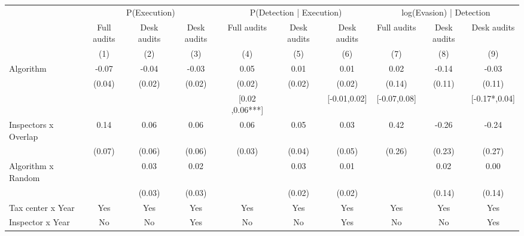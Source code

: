 \begin{tabular}{lccc|ccc|ccc} \toprule
\multicolumn{1}{l}{} & \multicolumn{3}{c}{P(Execution)} & \multicolumn{3}{c}{P(Detection | Execution)} & \multicolumn{3}{c}{log(Evasion) | Detection} \\\cmidrule(lr){2-4}\cmidrule(lr){5-7}\cmidrule(lr){8-10} \multicolumn{1}{l}{} & Full audits & Desk audits & Desk audits & Full audits & Desk audits & Desk audits & Full audits & Desk audits & Desk audits \\ \multicolumn{1}{l}{} & (1) & (2) & (3) & (4) & (5) & (6) & (7) & (8) & (9) \\ \midrule
Algorithm   &       -0.07\sym{*}  &       -0.04         &       -0.03         &        0.05\sym{**} &        0.01         &        0.01         &        0.02         &       -0.14         &       -0.03         \\
            &      (0.04)         &      (0.02)         &      (0.02)         &      (0.02)         &      (0.02)         &      (0.02)         &      (0.14)         &      (0.11)         &      (0.11)         \\
\addlinespace
 & & & & [0.02 ,0.06***] & & [-0.01,0.02] & [-0.07,0.08] & & [-0.17*,0.04] \\  Inspectors x Overlap&        0.14\sym{**} &        0.06         &        0.06         &        0.06\sym{*}  &        0.05         &        0.03         &        0.42         &       -0.26         &       -0.24         \\
            &      (0.07)         &      (0.06)         &      (0.06)         &      (0.03)         &      (0.04)         &      (0.05)         &      (0.26)         &      (0.23)         &      (0.27)         \\
\addlinespace
Algorithm x Random&                     &        0.03         &        0.02         &                     &        0.03         &        0.01         &                     &        0.02         &        0.00         \\
            &                     &      (0.03)         &      (0.03)         &                     &      (0.02)         &      (0.02)         &                     &      (0.14)         &      (0.14)         \\
\midrule
Tax center x Year&         Yes         &         Yes         &         Yes         &         Yes         &         Yes         &         Yes         &         Yes         &         Yes         &         Yes         \\
Inspector x Year&          No         &          No         &         Yes         &          No         &          No         &         Yes         &          No         &          No         &         Yes         \\

\end{tabular}
